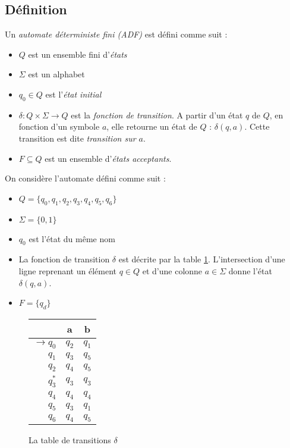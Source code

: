 	\subsection{Définition}\label{sub:dfa}
	
	Un \emph{automate déterministe fini (ADF)} \automaton est défini comme suit :
	\begin{itemize}
		\item $Q$ est un ensemble fini d'\emph{états}
		\item $\Sigma$ est un alphabet
		\item $q_0 \in Q$ est l'\emph{état initial}
		\item $\delta : Q \times \Sigma \rightarrow Q$ est la \emph{fonction de transition}. A partir d'un état $q$ de $Q$, en fonction d'un symbole $a$, elle retourne un état de $Q$ : $\delta(q,a)$. Cette transition est dite \emph{transition sur $a$}.
		\item $F \subseteq Q$ est un ensemble d'\emph{états acceptants}.
	\end{itemize}
	
	\begin{exemple}\label{ex:adf}
		On considère l'automate \automaton défini comme suit :
		\begin{itemize}
			\item $Q=\{q_0,q_1,q_2,q_3,q_4,q_5,q_6\}$
			\item $\Sigma=\{0,1\}$
			\item $q_0$ est l'état du même nom
			\item La fonction de transition $\delta$ est décrite par la table \ref{fig:transdelta}. L'intersection d'une ligne reprenant un élément $q \in Q$ et d'une colonne $a \in \Sigma$ donne l'état $\delta(q,a)$.
			\item $F=\{q_d\}$
		\end{itemize}
	
		\begin{figure}[H]
			\centering
			\begin{tabular}{|r||c|c|}
				\hline
				&a&b\\
				\hline\hline
				$\rightarrow q_0$&$q_2$&$q_1$\\\hline
				$q_1$&$q_3$&$q_5$\\\hline
				$q_2$&$q_4$&$q_5$\\\hline
				$q_3^*$&$q_3$&$q_3$\\\hline
				$q_4$&$q_4$&$q_4$\\\hline
				$q_5$&$q_3$&$q_1$\\\hline
				$q_6$&$q_4$&$q_5$\\\hline
			\end{tabular}
			\caption{La table de transitions $\delta$}
			\label{fig:transdelta}
		\end{figure}
	\end{exemple}
	 
